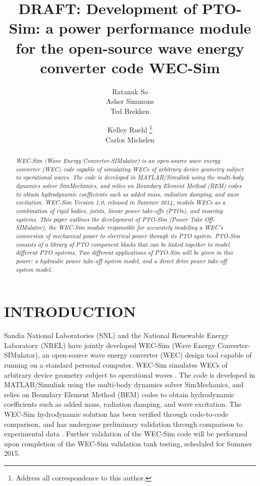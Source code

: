 \documentclass[twocolumn,10pt]{asme2e}
\title{DRAFT: Development of PTO-Sim: a power performance module for the open-source wave energy converter code WEC-Sim}
\author{Ratanak So\\
       {\tensfb Asher Simmons}   \\
       {\tensfb Ted Brekken}   
    \affiliation{
	School of Electrical Engineering and Computer Science\\
	Oregon State University\\
	Corvallis, Oregon USA\\
    }	
}
\author{Kelley Ruehl \thanks{Address all correspondence to this author.} \\
       {\tensfb Carlos Michelen}     
    \affiliation{Water Power Department \\
    	Sandia National Laboratories\\
	Albuquerque, NM USA\\
	Email: kelley.ruehl@sandia.gov
    }
}
\begin{document}
\maketitle    


\begin{abstract}
{\it 
WEC-Sim (Wave Energy Converter-SIMulator) is an open-source wave energy converter (WEC) code capable of simulating WECs of arbitrary device geometry subject to operational waves. The code is developed in MATLAB/Simulink using the multi-body dynamics solver SimMechanics, and relies on Boundary Element Method (BEM) codes to obtain hydrodynamic coefficients such as added mass, radiation damping, and wave excitation. WEC-Sim Version 1.0, released in Summer 2014, models WECs as a combination of rigid bodies, joints, linear power take-offs (PTOs), and mooring systems. This paper outlines the development of PTO-Sim (Power Take Off-SIMulator), the WEC-Sim module responsible for accurately modeling a WEC’s conversion of mechanical power to electrical power through its PTO system. PTO-Sim consists of a library of PTO component blocks that can be linked together to model different PTO systems. Two different applications of PTO-Sim will be given in this power: a hydraulic power take-off system model, and a direct drive power take-off system model.
}
\end{abstract}


\section*{INTRODUCTION}

Sandia National Laboratories (SNL) and the National Renewable Energy Laboratory (NREL) have jointly developed WEC-Sim (Wave Energy Converter-SIMulator), an open-source wave energy converter (WEC) design tool capable of running on a standard personal computer. WEC-Sim  simulates WECs of arbitrary device geometry subject to operational waves \cite{wecsim}. The code is developed in MATLAB/Simulink using the multi-body dynamics solver SimMechanics, and relies on Boundary Element Method (BEM) codes to obtain hydrodynamic coefficients such as added mass, radiation damping, and wave excitation. The WEC-Sim hydrodynamic solution has been verified through code-to-code comparison, and has undergone preliminary validation through comparison to experimental data \cite{yu2014design}\cite{lawson2014implementing} \cite{ruehl2014preliminary}\cite{yu2014development}.  
Further validation of the WEC-Sim code will be performed upon completion of the WEC-Sim validation tank testing, scheduled for Summer 2015. 
\end{document}
